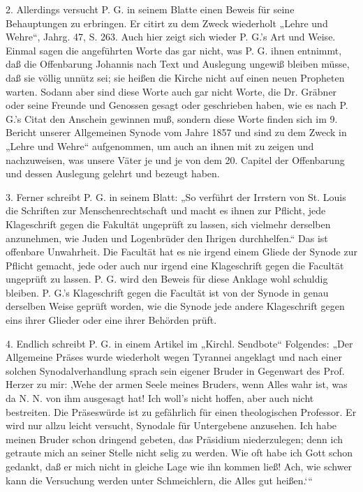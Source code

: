 2. Allerdings versucht P. G. in seinem Blatte einen Beweis für seine Behauptungen zu erbringen. Er citirt zu dem Zweck wiederholt „Lehre und Wehre“, Jahrg. 47, S. 263. Auch hier zeigt sich wieder P. G.’s Art und Weise. Einmal sagen die angeführten Worte das gar nicht, was P. G. ihnen entnimmt, daß die Offenbarung Johannis nach Text und Auslegung ungewiß bleiben müsse, daß sie völlig unnütz sei; sie heißen die Kirche nicht
auf einen neuen Propheten warten. Sodann aber sind diese Worte auch gar nicht Worte, die Dr. Gräbner oder seine Freunde und Genossen gesagt oder geschrieben haben, wie es nach P. G.’s Citat den Anschein gewinnen muß, sondern diese Worte finden sich im 9. Bericht unserer Allgemeinen Synode vom Jahre 1857 und sind zu dem Zweck in „Lehre und Wehre“ aufgenommen, um auch an ihnen mit zu zeigen und nachzuweisen, was unsere Väter je und je von dem 20. Capitel der Offenbarung und dessen Auslegung gelehrt und bezeugt haben.

3. Ferner schreibt P. G. in seinem Blatt: „So verführt der Irrstern von St. Louis die Schriften zur Menschenrechtschaft und macht es ihnen zur Pflicht, jede Klageschrift gegen die Fakultät ungeprüft zu lassen, sich vielmehr derselben anzunehmen, wie Juden und Logenbrüder den Ihrigen durchhelfen.“ Das ist offenbare Unwahrheit. Die Facultät hat es nie irgend einem Gliede der Synode zur Pflicht gemacht, jede oder auch nur irgend eine Klageschrift gegen die Facultät ungeprüft zu lassen. P. G. wird den Beweis für diese Anklage wohl schuldig bleiben. P. G.’s Klageschrift gegen die Facultät ist von der Synode in genau derselben Weise geprüft worden, wie die Synode jede andere Klageschrift gegen eins ihrer Glieder oder eine ihrer Behörden prüft.

4. Endlich schreibt P. G. in einem Artikel im „Kirchl. Sendbote“ Folgendes: „Der Allgemeine Präses wurde wiederholt wegen Tyrannei angeklagt und nach einer solchen Synodalverhandlung sprach sein eigener Bruder in Gegenwart des Prof. Herzer zu mir: ‚Wehe der armen Seele meines Bruders, wenn Alles wahr ist, was da N. N. von ihm ausgesagt hat! Ich woll’s nicht hoffen, aber auch nicht bestreiten. Die Präseswürde ist zu gefährlich für einen theologischen Professor. Er wird nur allzu leicht versucht, Synodale für Untergebene anzusehen. Ich habe meinen Bruder schon dringend gebeten, das Präsidium niederzulegen; denn ich getraute mich an seiner Stelle nicht selig zu werden. Wie oft habe ich Gott schon gedankt, daß er mich nicht in gleiche Lage wie ihn kommen ließ! Ach, wie schwer kann die Versuchung werden unter Schmeichlern, die Alles gut heißen.‘“

